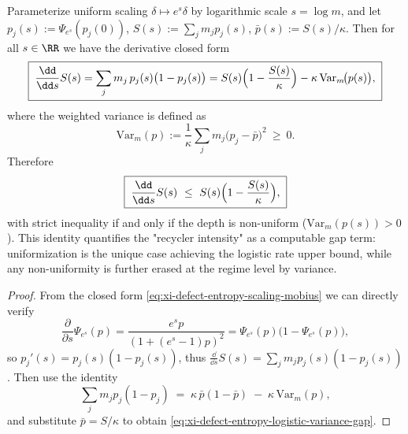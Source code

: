 \begin{proposition}\label{prop:xi-defect-entropy-scaling-variance-gap-identity}
Parameterize uniform scaling \(\delta\mapsto e^{s}\delta\) by logarithmic scale \(s=\log m\), and let
\(
p_j(s):=\Psi_{e^{s}}(p_j(0))
\),
\(
S(s):=\sum_j m_j p_j(s)
\),
\(
\bar p(s):=S(s)/\kappa
\).
Then for all \(s\in\RR\) we have the derivative closed form
\begin{equation}\label{eq:xi-defect-entropy-logistic-variance-gap}
\boxed{\;
\frac{\dd}{\dd s}S(s)
=\sum_j m_j\,p_j(s)\bigl(1-p_j(s)\bigr)
=S(s)\Bigl(1-\frac{S(s)}{\kappa}\Bigr)-\kappa\,\mathrm{Var}_m\!\bigl(p(s)\bigr),\;}
\end{equation}
where the weighted variance is defined as
\[
\mathrm{Var}_m(p):=\frac{1}{\kappa}\sum_j m_j\bigl(p_j-\bar p\bigr)^2\ \ge\ 0.
\]
Therefore
\[
\boxed{\;
\frac{\dd}{\dd s}S(s)\ \le\ S(s)\Bigl(1-\frac{S(s)}{\kappa}\Bigr),\;}
\]
with strict inequality if and only if the depth is non-uniform (\(\mathrm{Var}_m(p(s))>0\)).
This identity quantifies the "recycler intensity" as a computable gap term: uniformization is the unique case achieving the logistic rate upper bound, while any non-uniformity is further erased at the regime level by variance.
\end{proposition}

\begin{proof}
From the closed form \eqref{eq:xi-defect-entropy-scaling-mobius} we can directly verify
\[
\frac{\partial}{\partial s}\Psi_{e^s}(p)
=\frac{e^sp}{(1+(e^s-1)p)^2}
=\Psi_{e^s}(p)\bigl(1-\Psi_{e^s}(p)\bigr),
\]
so \(p_j'(s)=p_j(s)(1-p_j(s))\), thus \(\frac{\dd}{\dd s}S(s)=\sum_j m_j p_j(s)(1-p_j(s))\).
Then use the identity
\[
\sum_j m_j p_j(1-p_j)
\;=\;
\kappa\,\bar p(1-\bar p)\;-\;\kappa\,\mathrm{Var}_m(p),
\]
and substitute \(\bar p=S/\kappa\) to obtain \eqref{eq:xi-defect-entropy-logistic-variance-gap}.
\end{proof}

